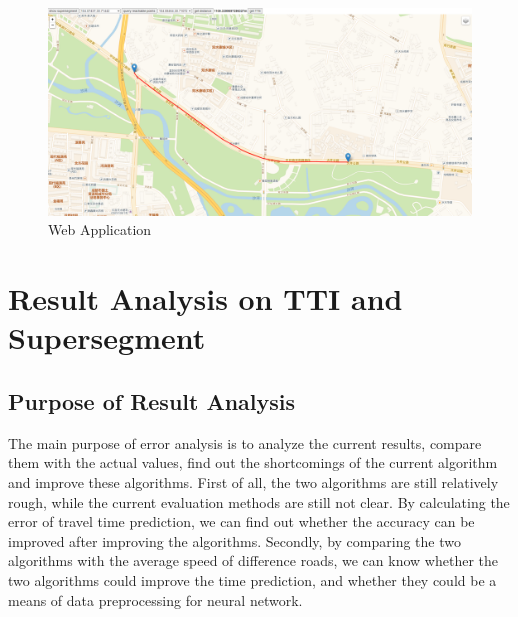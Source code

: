 \documentclass[fontset=none]{ctexart}
\theoremstyle{definition}
\theoremstyle{remark}
\begin{document}
\begin{figure}[htb]
  \centering
  \includegraphics[width=\textwidth]{images/app_example.png}
  \caption{Web Application}
  \label{app}
\end{figure}

\section{Result Analysis on TTI and Supersegment}
\subsection{Purpose of Result Analysis}
The main purpose of error analysis is to analyze the current results, compare them with the actual values, find out the shortcomings of the current algorithm and improve these algorithms. First of all, the two algorithms are still relatively rough, while the current evaluation methods are still not clear. By calculating the error of travel time prediction, we can find out whether the accuracy can be improved after improving the algorithms. Secondly, by comparing the two algorithms with the average speed of difference roads, we can know whether the two algorithms could improve the time prediction, and whether they could be a means of data preprocessing for neural network.

\clearpage
\end{document}
